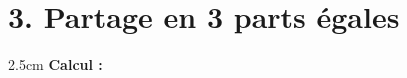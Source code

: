 \documentclass[a4paper]{book}
\begin{document}
    
    \section*{3. Partage en 3 parts égales}
    \noindent
    \begin{minipage}{0.6\textwidth}
        \centering
    \end{minipage}
    \hfill
    \begin{minipage}{0.35\textwidth}
        \begin{ZoneReponse}{2.5cm}
            \footnotesize \textbf{Calcul :}
        \end{ZoneReponse}
    \end{minipage}
    
\end{document}
